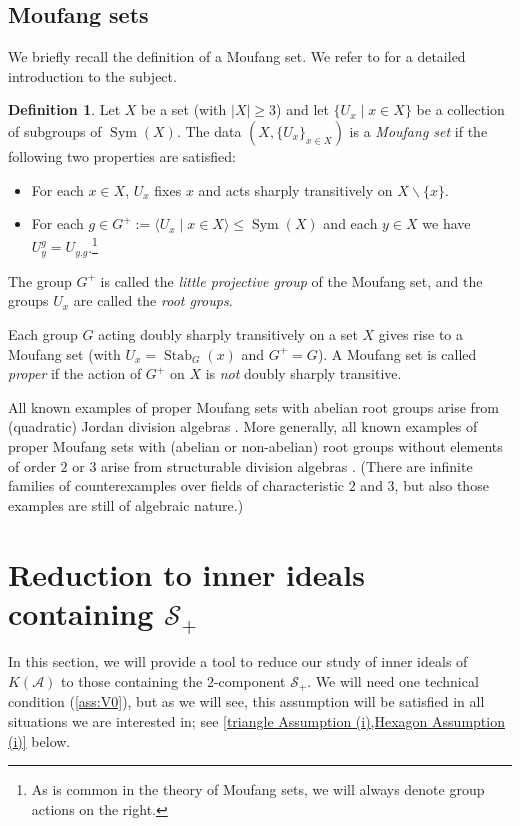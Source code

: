 \documentclass[oneside,a4paper]{amsart} %
\theoremstyle{definition}
\newtheorem{definition}[theorem]{Definition}
\DeclareMathOperator{\Sym}{Sym}
\newcommand{\A}{\mathcal{A}}
\renewcommand{\SS}{\mathcal{S}}
\numberwithin{equation}{section}
\begin{document}
\subsection{Moufang sets}

We briefly recall the definition of a Moufang set.
We refer to \cite{DeMedts2009} for a detailed introduction to the subject.

\begin{definition}
Let $X$ be a set (with $|X|\geq 3$) and let $\{U_x\mid x\in X\}$ be a collection of subgroups of $\Sym(X)$. 
The data $(X, \{U_x\}_{x\in X})$ is a \emph{Moufang set} if the following two properties are satisfied:
\begin{itemize}
	\item For each $x\in X$, $U_x$ fixes $x$ and acts  sharply transitively on $X \backslash \{x\}$.
	\item For each $g\in G^+:=\langle U_x\mid x\in X\rangle\leq \Sym(X)$ and each $y\in X$ we have $U_y^g=U_{y.g}$.\footnote{As is common in the theory of Moufang sets, we will always denote group actions on the right.}
\end{itemize}
The group $G^+$ is called the \emph{little projective group} of the Moufang set, and the groups
$U_x$ are called the \emph{root groups}.

Each group $G$ acting doubly sharply transitively on a set $X$ gives rise to a Moufang set (with $U_x = \operatorname{Stab}_G(x)$ and $G^+ = G$). A Moufang set is called \textit{proper} if the action of $G^+$ on $X$ is \textit{not} doubly sharply transitive.
\end{definition}

All known examples of proper Moufang sets with abelian root groups arise from (quadratic) Jordan division algebras \cite{DeMedts2006,DeMedts2008,Gruninger2015}.
More generally, all known examples of proper Moufang sets with (abelian or non-abelian) root groups without elements of order $2$ or $3$ arise from structurable division algebras \cite{Boelaert2019}.
(There are infinite families of counterexamples over fields of characteristic $2$ and $3$, but also those examples are still of algebraic nature.)


\section{Reduction to inner ideals containing $\SS_+$}
\label{sec 3}
In this section, we will provide a tool to reduce our study of inner ideals of $K(\A)$ to those containing the $2$-component $\SS_+$.
We will need one technical condition (\cref{ass:V0}), but as we will see, this assumption will be satisfied in all situations we are interested in; see \cref{triangle Assumption (i),Hexagon Assumption (i)} below.
\end{document}
